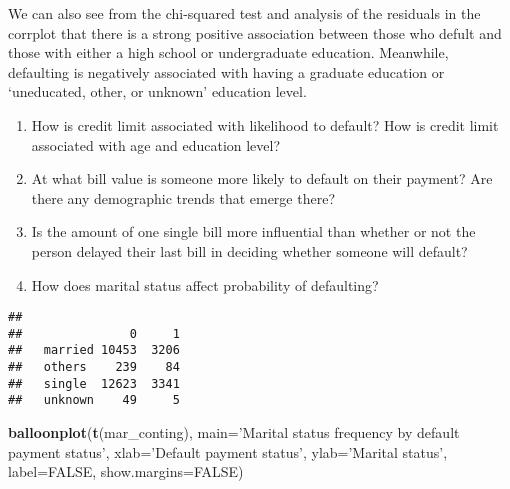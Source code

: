 \documentclass[]{article}
\newenvironment{Shaded}{\begin{snugshade}}{\end{snugshade}}
\newcommand{\KeywordTok}[1]{\textcolor[rgb]{0.13,0.29,0.53}{\textbf{#1}}}
\newcommand{\DataTypeTok}[1]{\textcolor[rgb]{0.13,0.29,0.53}{#1}}
\newcommand{\StringTok}[1]{\textcolor[rgb]{0.31,0.60,0.02}{#1}}
\newcommand{\CommentTok}[1]{\textcolor[rgb]{0.56,0.35,0.01}{\textit{#1}}}
\newcommand{\OtherTok}[1]{\textcolor[rgb]{0.56,0.35,0.01}{#1}}
\newcommand{\OperatorTok}[1]{\textcolor[rgb]{0.81,0.36,0.00}{\textbf{#1}}}
\newcommand{\NormalTok}[1]{#1}
\begin{document}
We can also see from the chi-squared test and analysis of the residuals
in the corrplot that there is a strong positive association between
those who defult and those with either a high school or undergraduate
education. Meanwhile, defaulting is negatively associated with having a
graduate education or `uneducated, other, or unknown' education level.

\begin{enumerate}
\def\labelenumi{\arabic{enumi}.}
\setcounter{enumi}{2}
\item
  How is credit limit associated with likelihood to default? How is
  credit limit associated with age and education level?
\item
  At what bill value is someone more likely to default on their payment?
  Are there any demographic trends that emerge there?
\item
  Is the amount of one single bill more influential than whether or not
  the person delayed their last bill in deciding whether someone will
  default?
\item
  How does marital status affect probability of defaulting?
\end{enumerate}

\begin{Shaded}
\end{Shaded}

\begin{verbatim}
##          
##               0     1
##   married 10453  3206
##   others    239    84
##   single  12623  3341
##   unknown    49     5
\end{verbatim}

\begin{Shaded}
\begin{Highlighting}[]
\KeywordTok{balloonplot}\NormalTok{(}\KeywordTok{t}\NormalTok{(mar_conting), }\DataTypeTok{main=}\StringTok{'Marital status frequency by default payment status'}\NormalTok{, }\DataTypeTok{xlab=}\StringTok{'Default payment status'}\NormalTok{, }\DataTypeTok{ylab=}\StringTok{'Marital status'}\NormalTok{, }\DataTypeTok{label=}\OtherTok{FALSE}\NormalTok{, }\DataTypeTok{show.margins=}\OtherTok{FALSE}\NormalTok{)}
\end{Highlighting}
\end{Shaded}
\end{document}
